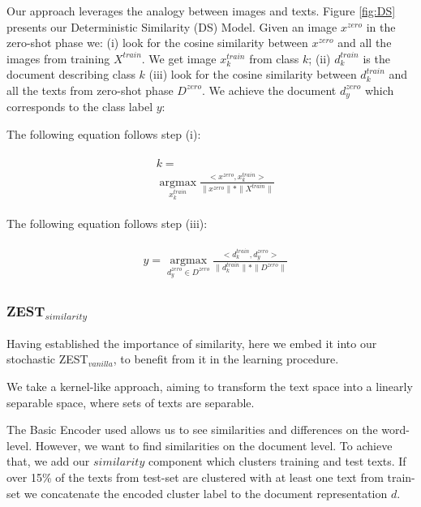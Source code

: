 \documentclass[11pt,a4paper]{article}
\begin{document}
Our approach leverages the analogy between images and texts. Figure \ref{fig:DS} presents our Deterministic Similarity (DS) Model. Given an image $x^{zero}$ in the zero-shot phase we: (i) look for the cosine similarity between $x^{zero}$ and all the images from training $X^{train}$. We get image $x_k^{train}$ from class $k$; (ii) $d_k^{train}$ is the document describing class $k$  (iii)
look for the cosine similarity between $d_k^{train}$ and all the texts from zero-shot phase $D^{zero}$. We achieve the document $d_y^{zero}$ which corresponds to the class label $y$:


The following equation follows step (i):

\begin{equation}
\begin{aligned}
\begin{split}
&k= \\
&\operatorname*{argmax}_{x^{train}_k} \frac{<x^{zero},x^{train}_k>}{\| x^{zero}\| *\| X^{train}\| } %
\end{split}
\end{aligned}
\end{equation}

The following equation follows step (iii):

\begin{equation}
\begin{aligned}
\begin{split}
&y=\operatorname*{argmax}_{d_y^{zero}\in D^{zero}} \frac{<d^{train}_k,d_y^{zero}>}{\| d_k^{train}\| *\| D^{zero}\| } %
\end{split}
\end{aligned}
\end{equation}

\subsubsection{ZEST$_{similarity}$}

Having established the importance of similarity, here we embed it into our stochastic ZEST$_{vanilla}$, to benefit from it in the learning procedure. \par

We take a kernel-like approach, aiming to transform the text space into a linearly separable space, where sets of texts are separable. \par

The Basic Encoder used allows us to see similarities and differences on the word-level. However, we want to find similarities on the document level. To achieve that, we add our $similarity$ component which clusters training and test texts. If over 15\% of the texts from test-set are clustered with at least one text from train-set we concatenate the encoded cluster label to the document representation $d$. \par
\end{document}
